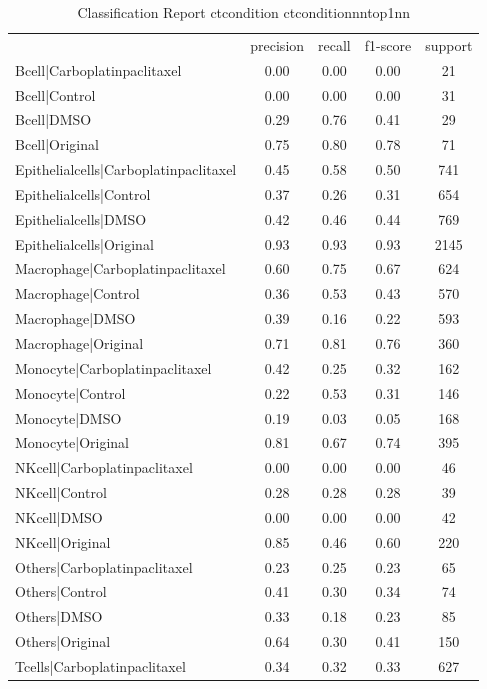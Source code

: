 \begin{table}[htbp]
\centering
\caption{Classification Report ctcondition ctconditionnntop1nn}
\label{tab:classificationreport.ctcondition.ctconditionnntop1nn}
\begin{tabular}{lcccc}
 & precision & recall & f1-score & support \\
Bcell|Carboplatinpaclitaxel & 0.00 & 0.00 & 0.00 & 21 \\
Bcell|Control & 0.00 & 0.00 & 0.00 & 31 \\
Bcell|DMSO & 0.29 & 0.76 & 0.41 & 29 \\
Bcell|Original & 0.75 & 0.80 & 0.78 & 71 \\
Epithelialcells|Carboplatinpaclitaxel & 0.45 & 0.58 & 0.50 & 741 \\
Epithelialcells|Control & 0.37 & 0.26 & 0.31 & 654 \\
Epithelialcells|DMSO & 0.42 & 0.46 & 0.44 & 769 \\
Epithelialcells|Original & 0.93 & 0.93 & 0.93 & 2145 \\
Macrophage|Carboplatinpaclitaxel & 0.60 & 0.75 & 0.67 & 624 \\
Macrophage|Control & 0.36 & 0.53 & 0.43 & 570 \\
Macrophage|DMSO & 0.39 & 0.16 & 0.22 & 593 \\
Macrophage|Original & 0.71 & 0.81 & 0.76 & 360 \\
Monocyte|Carboplatinpaclitaxel & 0.42 & 0.25 & 0.32 & 162 \\
Monocyte|Control & 0.22 & 0.53 & 0.31 & 146 \\
Monocyte|DMSO & 0.19 & 0.03 & 0.05 & 168 \\
Monocyte|Original & 0.81 & 0.67 & 0.74 & 395 \\
NKcell|Carboplatinpaclitaxel & 0.00 & 0.00 & 0.00 & 46 \\
NKcell|Control & 0.28 & 0.28 & 0.28 & 39 \\
NKcell|DMSO & 0.00 & 0.00 & 0.00 & 42 \\
NKcell|Original & 0.85 & 0.46 & 0.60 & 220 \\
Others|Carboplatinpaclitaxel & 0.23 & 0.25 & 0.23 & 65 \\
Others|Control & 0.41 & 0.30 & 0.34 & 74 \\
Others|DMSO & 0.33 & 0.18 & 0.23 & 85 \\
Others|Original & 0.64 & 0.30 & 0.41 & 150 \\
Tcells|Carboplatinpaclitaxel & 0.34 & 0.32 & 0.33 & 627 \\

\end{tabular}
\end{table}
